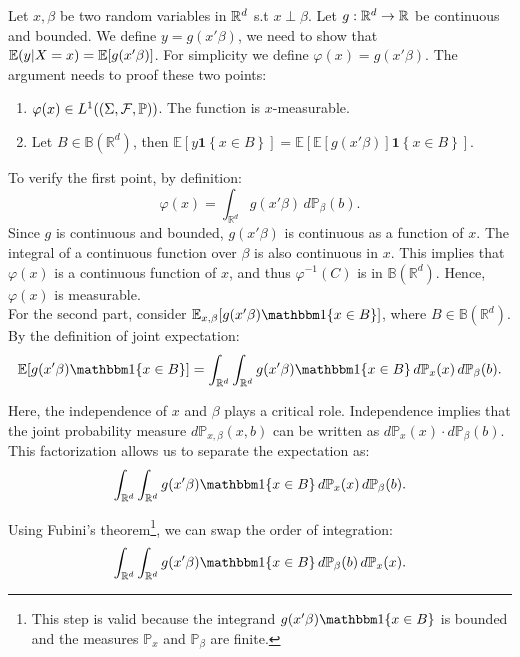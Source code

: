 \documentclass{article}
\begin{document}
    \begin{example}
Let \(x, \beta\) be two random variables in \(\mathbb{R}^{d}\) s.t \(x \perp \beta\). Let \(g:\mathbb{R}^{d} \rightarrow \mathbb{R}\) be continuous and bounded. We define \(y=g(x'\beta)\), we need to show that \(\mathbb{E}(y|X=x)=\mathbb{E}[g(x'\beta)]\). For simplicity we define $\varphi(x)=g(x'\beta)$. The argument needs to proof these two points: 
\begin{enumerate}
    \item $\varphi(x) \in L^{1}((\Sigma, \mathcal{F}, \mathbb{P}))$. The function is $x$-measurable.
    \item Let \(B \in \mathbb{B}(\mathbb{R}^{d})\), then \(\mathbb{E} \left[y \mathbf{1} \left\{x \in B \right\}\right] = \mathbb{E} \left[\mathbb{E} \left[ g(x'\beta) \right] \mathbf{1} \left\{x \in B \right\}\right]\).
\end{enumerate}

 
    
    To verify the first point, by definition:
    \[
    \varphi(x) = \int_{\mathbb{R}^{d}} g(x'\beta) \, d\mathbb{P}_{\beta}(b).
    \]
    Since \(g\) is continuous and bounded, \(g(x'\beta)\) is continuous as a function of \(x\). The integral of a continuous function over \(\beta\) is also continuous in \(x\). This implies that \(\varphi(x)\) is a continuous function of \(x\), and thus \(\varphi^{-1}(C)\) is in \(\mathbb{B}(\mathbb{R}^{d})\). Hence, \(\varphi(x)\) is measurable. \\
    
    For the second part, consider \(\mathbb{E}_{x, \beta}[g(x'\beta) \indf \{x \in B\}]\), where \(B \in \mathbb{B}(\mathbb{R}^{d})\). By the definition of joint expectation:
    \[
    \mathbb{E}[g(x'\beta) \indf \{x \in B\}] = \int_{\mathbb{R}^{d}} \int_{\mathbb{R}^{d}} g(x'\beta) \indf \{x \in B\} \, d\mathbb{P}_{x}(x) \, d\mathbb{P}_{\beta}(b).
    \] 
    
    Here, the independence of \(x\) and \(\beta\) plays a critical role. Independence implies that the joint probability measure \(d\mathbb{P}_{x, \beta}(x, b)\) can be written as \(d\mathbb{P}_{x}(x) \cdot d\mathbb{P}_{\beta}(b)\). This factorization allows us to separate the expectation as:
    \[
    \int_{\mathbb{R}^{d}} \int_{\mathbb{R}^{d}} g(x'\beta) \indf \{x \in B\} \, d\mathbb{P}_{x}(x) \, d\mathbb{P}_{\beta}(b).
    \]

    
    Using Fubini’s theorem\footnote{This step is valid because the integrand \(g(x'\beta) \indf \{x \in B\}\) is bounded and the measures \(\mathbb{P}_x\) and \(\mathbb{P}_\beta\) are finite.}, we can swap the order of integration:
    \[
    \int_{\mathbb{R}^{d}} \int_{\mathbb{R}^{d}} g(x'\beta) \indf \{x \in B\} \, d\mathbb{P}_{\beta}(b) \, d\mathbb{P}_{x}(x).
    \]


\end{example}
\end{document}
